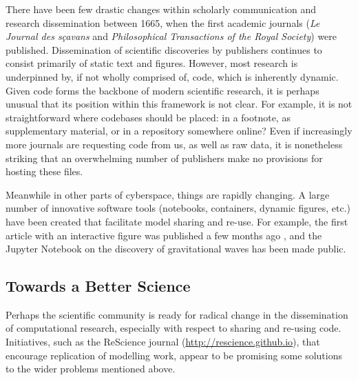 \documentclass[jou]{apa6}
\begin{document}
There have been few drastic changes within scholarly communication and research dissemination between 1665, when the first academic journals (\textit{Le Journal des sçavans} and \textit{Philosophical Transactions of the Royal Society}) were published.
Dissemination of scientific discoveries by publishers continues to consist primarily of static text and figures.
However, most research is underpinned by, if not wholly comprised of, code, which is inherently dynamic.
Given code forms the backbone of modern scientific research, it is perhaps unusual that its position within this framework is not clear.
For example, it is not straightforward where codebases should be placed: in a footnote, as supplementary material, or in a repository somewhere online?
Even if increasingly more journals are requesting code from us, as well as raw data, it is nonetheless striking that an overwhelming number of publishers make no provisions for hosting these files.

Meanwhile in other parts of cyberspace, things are rapidly changing.
A large number of innovative software tools (notebooks, containers, dynamic figures, etc.) have been created that facilitate model sharing and re-use.
For example, the first article with an interactive figure was published a few months ago \cite{ogrean16}, and the Jupyter Notebook on the discovery of gravitational waves has been made public.

\subsection*{Towards a Better Science}

Perhaps the scientific community is ready for radical change in the dissemination of computational research, especially with respect to sharing and re-using code.
Initiatives, such as the ReScience journal ({\url{http://rescience.github.io}}), that encourage replication of modelling work, appear to be promising some solutions to the wider problems mentioned above.






\hspace*{1cm}
\end{document}
